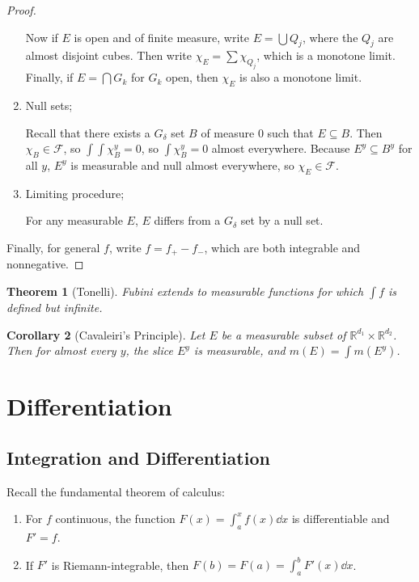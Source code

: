 \documentclass[leqno, openany]{memoir}
\newtheorem{thm}{Theorem}[chapter]
\newtheorem{cor}[thm]{Corollary}
\theoremstyle{definition}
\theoremstyle{remark}
\theoremstyle{plain}
\theoremstyle{definition}
\theoremstyle{remark}
\newcommand{\R}{\mathbb{R}}
\newcommand{\mc}[1]{\mathcal{#1}}
\begin{document}
\begin{proof}
\begin{enumerate}
            Now if $E$ is open and of finite measure, write $E = \bigcup Q_j$, where the $Q_j$ are almost disjoint cubes. Then write $\chi_E = \sum \chi_{Q_j}$, which is a monotone limit. Finally, if $E = \bigcap G_k$ for $G_k$ open, then $\chi_E$ is also a monotone limit.
        \item Null sets;

            Recall that there exists a $G_{\delta}$ set $B$ of measure $0$ such that $E \subseteq B$. Then $\chi_B \in \mc{F}$, so $\int \int \chi_B^y = 0$, so $\int \chi_B^y = 0$ almost everywhere. Because $E^y \subseteq B^y$ for all $y$, $E^y$ is measurable and null almost everywhere, so $\chi_E \in \mc{F}$.
        \item Limiting procedure;

            For any measurable $E$, $E$ differs from a $G_{\delta}$ set by a null set.
    \end{enumerate}
    Finally, for general $f$, write $f = f_+ - f_-$, which are both integrable and nonnegative.
\end{proof}

\begin{thm}[Tonelli]
    Fubini extends to measurable functions for which $\int f$ is defined but infinite.
\end{thm}

\begin{cor}[Cavaleiri's Principle]
    Let $E$ be a measurable subset of $\R^{d_1} \times \R^{d_2}$. Then for almost every $y$, the slice $E^y$ is measurable, and $m(E) = \int m(E^y)$.
\end{cor}

\chapter{Differentiation}%
\label{cha:differentiation}

\section{Integration and Differentiation}%
\label{sec:integration_and_differentiation}

Recall the fundamental theorem of calculus:
\begin{enumerate}
    \item For $f$ continuous, the function $F(x) = \int_a^x f(x) \dd{x}$ is differentiable and $F' = f$.
    \item If $F'$ is Riemann-integrable, then $F(b) = F(a) = \int_a^b F'(x) \dd{x}$.
\end{enumerate}
\end{document}
